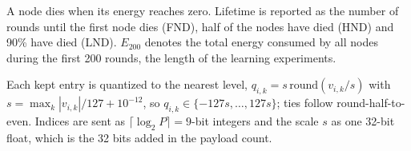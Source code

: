 
A node dies when its energy reaches zero. Lifetime is reported as the number of rounds
until the first node dies (FND), half of the nodes have died (HND) and 90\% have died
(LND). $E_{200}$ denotes the total energy consumed by all nodes during the first 200
rounds, the length of the learning experiments.

Each kept entry is quantized to the nearest level, $q_{i,k}=s\,\mathrm{round}(v_{i,k}/s)$
with $s=\max_k|v_{i,k}|/127+10^{-12}$, so $q_{i,k}\in\{-127s,\dots,127s\}$; ties follow
round-half-to-even. Indices are sent as $\lceil\log_2P\rceil=9$-bit integers and the scale
$s$ as one 32-bit float, which is the 32 bits added in the payload count.

